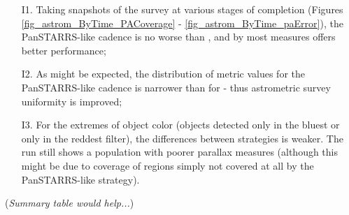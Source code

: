 \begin{itemize}
  \item[I1.] Taking snapshots of the survey at various stages of completion (Figures \ref{fig_astrom_ByTime_PACoverage} -  \ref{fig_astrom_ByTime_paError}), the PanSTARRS-like cadence is no worse than , and by most measures offers better performance;
\item[I2.] As might be expected, the distribution of metric values for the PanSTARRS-like cadence is narrower than for  - thus astrometric survey uniformity is improved; 
\item[I3.] For the extremes of object color (objects detected only in the bluest or only in the reddest filter), the differences between strategies is weaker. The run  still shows a population with poorer parallax measures (although this might be due to coverage of regions simply not covered at all by the PanSTARRS-like strategy).
\end{itemize}

({\it Summary table would help...})

